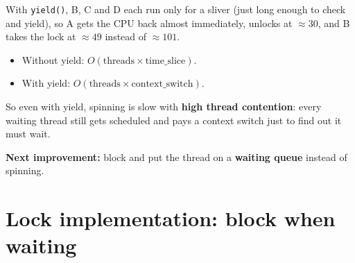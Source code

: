 \documentclass[11pt,a4paper]{article}
\newcommand{\blk}[5]{\draw[#4] (#1,0) rectangle (#2,1);
  \node[text=#5, font=\scriptsize\bfseries] at ({(#1+#2)/2},0.5) {#3};}
\newcommand{\ev}[2]{\node[font=\tiny, align=center, above] (e) at (#1,1.35) {#2};
  \draw[-{Latex[length=1.2mm]}] (#1,1.38) -- (#1,1.02);}
\newcommand{\spin}[2]{\node[font=\tiny, fill=black, text=white, inner sep=1.2pt] at ({(#1+#2)/2},1.22) {spin};}
\newcommand{\taxis}{\draw (0,-0.05) -- (160,-0.05);
  \foreach \t in {0,20,...,160} { \draw (\t,-0.05) -- (\t,-0.2); \node[below] at (\t,-0.15) {\t}; }}
\begin{document}
\begin{center}
\end{center}

With \texttt{yield()}, B, C and D each run only for a sliver (just long
enough to check and yield), so A gets the CPU back almost immediately,
unlocks at \(\approx 30\), and B takes the lock at \(\approx 49\) instead of
\(\approx 101\).

\begin{keybox}[Waste]
\begin{itemize}
  \item Without yield: \(O(\text{threads} \times \text{time\_slice})\).
  \item With yield: \(O(\text{threads} \times \text{context\_switch})\).
\end{itemize}
So even with yield, spinning is slow with \textbf{high thread contention}:
every waiting thread still gets scheduled and pays a context switch just to
find out it must wait.

\textbf{Next improvement:} block and put the thread on a \textbf{waiting
queue} instead of spinning.
\end{keybox}

\section{Lock implementation: block when waiting}
\end{document}
